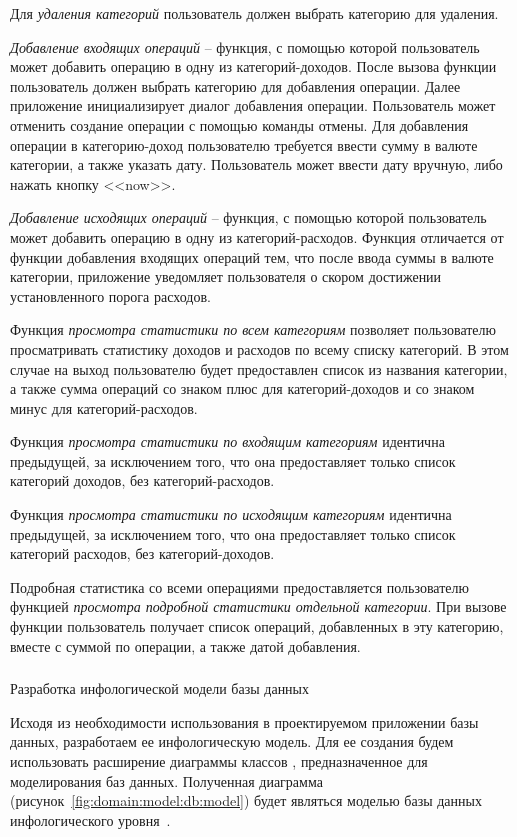Для \emph{удаления категорий} пользователь должен выбрать категорию для удаления.

\emph{Добавление входящих операций} -- функция, с помощью которой пользователь может добавить операцию в одну из категорий-доходов. После вызова функции пользователь должен выбрать категорию для добавления операции. Далее приложение инициализирует диалог добавления операции. Пользователь может отменить создание операции с помощью команды отмены. Для добавления операции в категорию-доход пользователю требуется ввести сумму в валюте категории, а также указать дату. Пользователь может ввести дату вручную, либо нажать кнопку <<now>>.

\emph{Добавление исходящих операций} -- функция, с помощью которой пользователь может добавить операцию в одну из категорий-расходов. Функция отличается от функции добавления входящих операций тем, что после ввода суммы в валюте категории, приложение уведомляет пользователя о скором достижении установленного порога расходов.

Функция \emph{просмотра статистики по всем категориям} позволяет пользователю просматривать статистику доходов и расходов по всему списку категорий. В этом случае на выход пользователю будет предоставлен список из названия категории, а также сумма операций со знаком плюс для категорий-доходов и со знаком минус для категорий-расходов.

Функция \emph{просмотра статистики по входящим категориям} идентична предыдущей, за исключением того, что она предоставляет только список категорий доходов, без категорий-расходов.

Функция \emph{просмотра статистики по исходящим категориям} идентична предыдущей, за исключением того, что она предоставляет только список категорий расходов, без категорий-доходов.

Подробная статистика со всеми операциями предоставляется пользователю функцией \emph{просмотра подробной статистики отдельной категории}. При вызове функции пользователь получает список операций, добавленных в эту категорию, вместе с суммой по операции, а также датой добавления.

\subsubsection{} Разработка инфологической модели базы данных
\label{sec:domain:model:db}

Исходя из необходимости использования в проектируемом приложении базы данных, разработаем ее инфологическую модель. Для ее создания будем использовать расширение диаграммы классов \uml, предназначенное для моделирования баз данных. Полученная диаграмма (рисунок~\ref{fig:domain:model:db:model}) будет являться моделью базы данных инфологического уровня~\cite{kulikov_db_workbook}.

